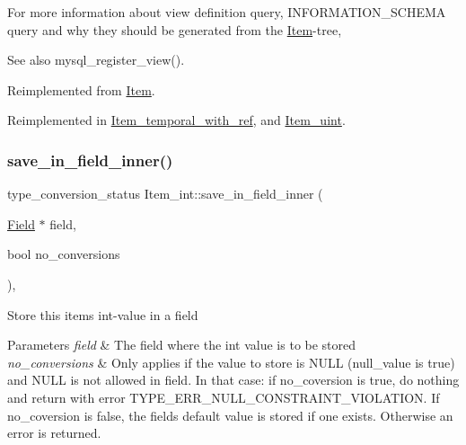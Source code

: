 For more information about view definition query, I\+N\+F\+O\+R\+M\+A\+T\+I\+O\+N\+\_\+\+S\+C\+H\+E\+MA query and why they should be generated from the \mbox{\hyperlink{classItem}{Item}}-\/tree, \begin{DoxySeeAlso}{See also}
mysql\+\_\+register\+\_\+view(). 
\end{DoxySeeAlso}


Reimplemented from \mbox{\hyperlink{classItem_aa7ba4bde739d83adec8edf3bf1596d94}{Item}}.



Reimplemented in \mbox{\hyperlink{classItem__temporal__with__ref_ab32f4567ebd0183a399f1a0b8c66e2e8}{Item\+\_\+temporal\+\_\+with\+\_\+ref}}, and \mbox{\hyperlink{classItem__uint_a24c54d4822268228386af4160895372c}{Item\+\_\+uint}}.

\mbox{\label{classItem__int_a61fc7a6461f8d3f027fc91b5aeca8d1b}} 
\subsubsection{\texorpdfstring{save\+\_\+in\+\_\+field\+\_\+inner()}{save\_in\_field\_inner()}}
{\footnotesize\ttfamily type\+\_\+conversion\+\_\+status Item\+\_\+int\+::save\+\_\+in\+\_\+field\+\_\+inner (\begin{DoxyParamCaption}\item[{\mbox{\hyperlink{classField}{Field}} $\ast$}]{field,  }\item[{bool}]{no\+\_\+conversions }\end{DoxyParamCaption})\hspace{0.3cm}{\ttfamily [protected]}, {\ttfamily [virtual]}}

Store this item\textquotesingle{}s int-\/value in a field


\begin{DoxyParams}{Parameters}
{\em field} & The field where the int value is to be stored \\
\hline
{\em no\+\_\+conversions} & Only applies if the value to store is N\+U\+LL (null\+\_\+value is true) and N\+U\+LL is not allowed in field. In that case\+: if no\+\_\+coversion is true, do nothing and return with error T\+Y\+P\+E\+\_\+\+E\+R\+R\+\_\+\+N\+U\+L\+L\+\_\+\+C\+O\+N\+S\+T\+R\+A\+I\+N\+T\+\_\+\+V\+I\+O\+L\+A\+T\+I\+ON. If no\+\_\+coversion is false, the field\textquotesingle{}s default value is stored if one exists. Otherwise an error is returned.\\
\hline
\end{DoxyParams}

